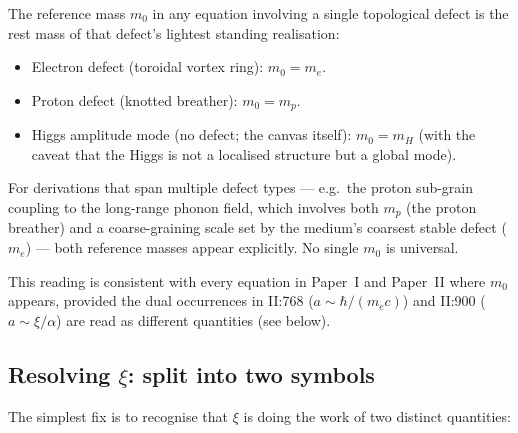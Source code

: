 \documentclass[11pt,a4paper]{article}
\begin{document}
\begin{decisionbox}
The reference mass $m_0$ in any equation involving a single topological
defect is the rest mass of that defect's lightest standing realisation:
\begin{itemize}
\item Electron defect (toroidal vortex ring): $m_0 = m_e$.
\item Proton defect (knotted breather): $m_0 = m_p$.
\item Higgs amplitude mode (no defect; the canvas itself):
      $m_0 = m_H$ (with the caveat that the Higgs is not a localised
      structure but a global mode).
\end{itemize}
For derivations that span multiple defect types --- e.g.\ the proton
sub-grain coupling to the long-range phonon field, which involves both
$m_p$ (the proton breather) and a coarse-graining scale set by the
medium's coarsest stable defect ($m_e$) --- both reference masses appear
explicitly.  No single $m_0$ is universal.
\end{decisionbox}

This reading is consistent with every equation in Paper~I and Paper~II
where $m_0$ appears, provided the dual occurrences in II:768 ($a \sim
\hbar/(m_e c)$) and II:900 ($a \sim \xi/\alpha$) are read as different
quantities (see below).

\subsection{Resolving $\xi$: split into two symbols}

The simplest fix is to recognise that $\xi$ is doing the work of two
distinct quantities:
\end{document}
